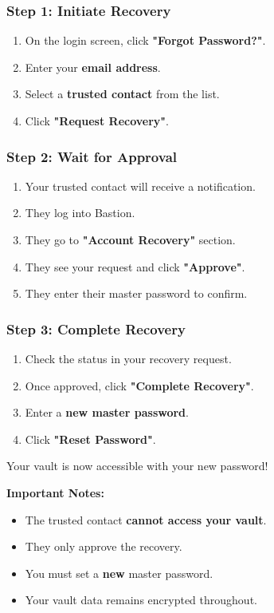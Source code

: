 \documentclass[11pt,a4paper]{article}
\begin{document}
\subsubsection{Step 1: Initiate Recovery}
\begin{enumerate}
    \item On the login screen, click \textbf{"Forgot Password?"}.
    \item Enter your \textbf{email address}.
    \item Select a \textbf{trusted contact} from the list.
    \item Click \textbf{"Request Recovery"}.
\end{enumerate}

\subsubsection{Step 2: Wait for Approval}
\begin{enumerate}
    \item Your trusted contact will receive a notification.
    \item They log into Bastion.
    \item They go to \textbf{"Account Recovery"} section.
    \item They see your request and click \textbf{"Approve"}.
    \item They enter their master password to confirm.
\end{enumerate}

\subsubsection{Step 3: Complete Recovery}
\begin{enumerate}
    \item Check the status in your recovery request.
    \item Once approved, click \textbf{"Complete Recovery"}.
    \item Enter a \textbf{new master password}.
    \item Click \textbf{"Reset Password"}.
\end{enumerate}
Your vault is now accessible with your new password!

\textbf{Important Notes:}
\begin{itemize}
    \item The trusted contact \textbf{cannot access your vault}.
    \item They only approve the recovery.
    \item You must set a \textbf{new} master password.
    \item Your vault data remains encrypted throughout.
\end{itemize}
\end{document}
